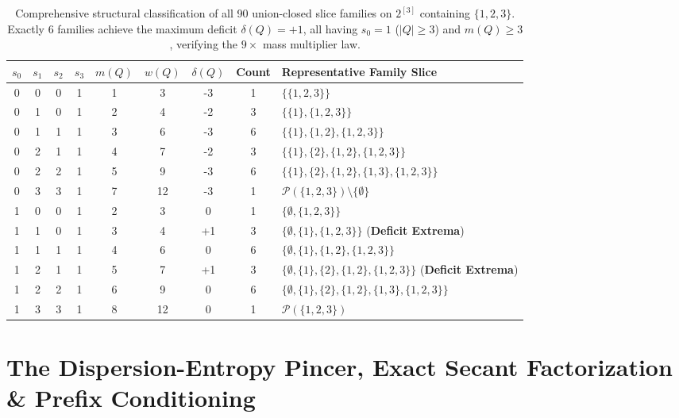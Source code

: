 \documentclass[11pt,a4paper]{article}
\theoremstyle{plain}
\theoremstyle{definition}
\theoremstyle{remark}
\begin{document}
\begin{table}[h!]
\centering
\small
\begin{tabular}{@{}ccccccccp{5.5cm}@{}}
\toprule
$s_0$ & $s_1$ & $s_2$ & $s_3$ & $m(Q)$ & $w(Q)$ & $\delta(Q)$ & Count & Representative Family Slice \\
\midrule
0 & 0 & 0 & 1 & 1 & 3 & -3 & 1 & $\{\{1,2,3\}\}$ \\
0 & 1 & 0 & 1 & 2 & 4 & -2 & 3 & $\{\{1\}, \{1,2,3\}\}$ \\
0 & 1 & 1 & 1 & 3 & 6 & -3 & 6 & $\{\{1\}, \{1,2\}, \{1,2,3\}\}$ \\
0 & 2 & 1 & 1 & 4 & 7 & -2 & 3 & $\{\{1\}, \{2\}, \{1,2\}, \{1,2,3\}\}$ \\
0 & 2 & 2 & 1 & 5 & 9 & -3 & 6 & $\{\{1\}, \{2\}, \{1,2\}, \{1,3\}, \{1,2,3\}\}$ \\
0 & 3 & 3 & 1 & 7 & 12 & -3 & 1 & $\mathcal{P}(\{1,2,3\}) \setminus \{\emptyset\}$ \\
1 & 0 & 0 & 1 & 2 & 3 & 0 & 1 & $\{\emptyset, \{1,2,3\}\}$ \\
1 & 1 & 0 & 1 & 3 & 4 & +1 & 3 & $\{\emptyset, \{1\}, \{1,2,3\}\}$ (\textbf{Deficit Extrema}) \\
1 & 1 & 1 & 1 & 4 & 6 & 0 & 6 & $\{\emptyset, \{1\}, \{1,2\}, \{1,2,3\}\}$ \\
1 & 2 & 1 & 1 & 5 & 7 & +1 & 3 & $\{\emptyset, \{1\}, \{2\}, \{1,2\}, \{1,2,3\}\}$ (\textbf{Deficit Extrema}) \\
1 & 2 & 2 & 1 & 6 & 9 & 0 & 6 & $\{\emptyset, \{1\}, \{2\}, \{1,2\}, \{1,3\}, \{1,2,3\}\}$ \\
1 & 3 & 3 & 1 & 8 & 12 & 0 & 1 & $\mathcal{P}(\{1,2,3\})$ \\
\bottomrule
\end{tabular}
\caption{Comprehensive structural classification of all 90 union-closed slice families on $2^{[3]}$ containing $\{1, 2, 3\}$. Exactly 6 families achieve the maximum deficit $\delta(Q) = +1$, all having $s_0 = 1$ ($|Q| \ge 3$) and $m(Q) \ge 3$, verifying the $9\times$ mass multiplier law.}
\label{tab:k3_families}
\end{table}

\section{The Dispersion-Entropy Pincer, Exact Secant Factorization \& Prefix Conditioning}\label{sec:pincer}
\end{document}
